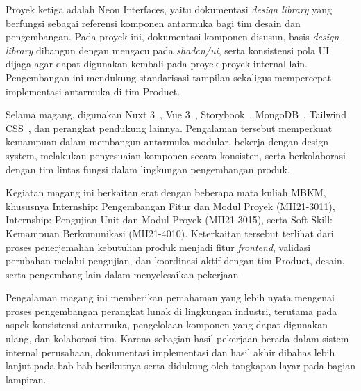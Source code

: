 Proyek ketiga adalah Neon Interfaces, yaitu dokumentasi \textit{design library} yang berfungsi sebagai referensi komponen antarmuka bagi tim desain dan pengembangan. Pada proyek ini, dokumentasi komponen disusun, basis \textit{design library} dibangun dengan mengacu pada \textit{shadcn/ui}, serta konsistensi pola UI dijaga agar dapat digunakan kembali pada proyek-proyek internal lain. Pengembangan ini mendukung standarisasi tampilan sekaligus mempercepat implementasi antarmuka di tim Product.

Selama magang, digunakan Nuxt 3~\cite{nuxt3_docs}, Vue 3~\cite{vue3_docs}, Storybook~\cite{storybook_docs}, MongoDB~\cite{mongodb_docs}, Tailwind CSS~\cite{tailwind_docs}, dan perangkat pendukung lainnya. Pengalaman tersebut memperkuat kemampuan dalam membangun antarmuka modular, bekerja dengan design system, melakukan penyesuaian komponen secara konsisten, serta berkolaborasi dengan tim lintas fungsi dalam lingkungan pengembangan produk.

Kegiatan magang ini berkaitan erat dengan beberapa mata kuliah MBKM, khususnya Internship: Pengembangan Fitur dan Modul Proyek (MII21-3011), Internship: Pengujian Unit dan Modul Proyek (MII21-3015), serta Soft Skill: Kemampuan Berkomunikasi (MII21-4010). Keterkaitan tersebut terlihat dari proses penerjemahan kebutuhan produk menjadi fitur \textit{frontend}, validasi perubahan melalui pengujian, dan koordinasi aktif dengan tim Product, desain, serta pengembang lain dalam menyelesaikan pekerjaan.

Pengalaman magang ini memberikan pemahaman yang lebih nyata mengenai proses pengembangan perangkat lunak di lingkungan industri, terutama pada aspek konsistensi antarmuka, pengelolaan komponen yang dapat digunakan ulang, dan kolaborasi tim. Karena sebagian hasil pekerjaan berada dalam sistem internal perusahaan, dokumentasi implementasi dan hasil akhir dibahas lebih lanjut pada bab-bab berikutnya serta didukung oleh tangkapan layar pada bagian lampiran.